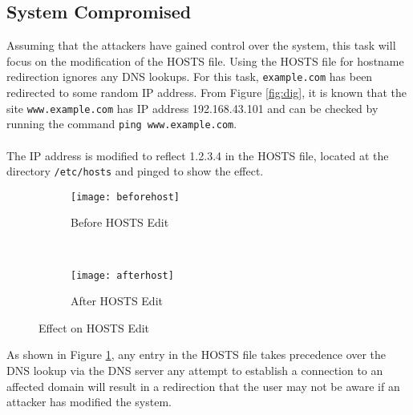 \documentclass[a4paper,12pt]{article}
\begin{document}
		\subsection{System Compromised}
		\begin{par}Assuming that the attackers have gained control over the system, this task will focus on the modification of the HOSTS file. Using the HOSTS file for hostname redirection ignores any DNS lookups. For this task, \texttt{example.com} has been redirected to some random IP address. From Figure \ref{fig:dig}, it is known that the site \texttt{www.example.com} has IP address 192.168.43.101 and can be checked by running the command \texttt{ping www.example.com}. \\\\The IP address is modified to reflect 1.2.3.4 in the HOSTS file, located at the directory \texttt{/etc/hosts} and pinged to show the effect.\end{par}
		\begin{figure}[H]
		    \centering
		    \begin{subfigure}[h]{0.49\textwidth}
		        \centering
		        \texttt{[image: beforehost]}
		        \caption{Before HOSTS Edit}
		    \end{subfigure}%
		    ~ 
		    \begin{subfigure}[h]{0.49\textwidth}
		        \centering
		        \texttt{[image: afterhost]}
		        \caption{After HOSTS Edit}
		    \end{subfigure}
		    \caption{Effect on HOSTS Edit}
		    \label{fig:hostsfile}
		\end{figure}
		\vspace{1em}
		\begin{par}
		\noindent As shown in Figure \ref{fig:hostsfile}, any entry in the HOSTS file takes precedence over the DNS lookup via the DNS server any attempt to establish a connection to an affected domain will result in a redirection that the user may not be aware if an attacker has modified the system.
		\end{par}
\end{document}
